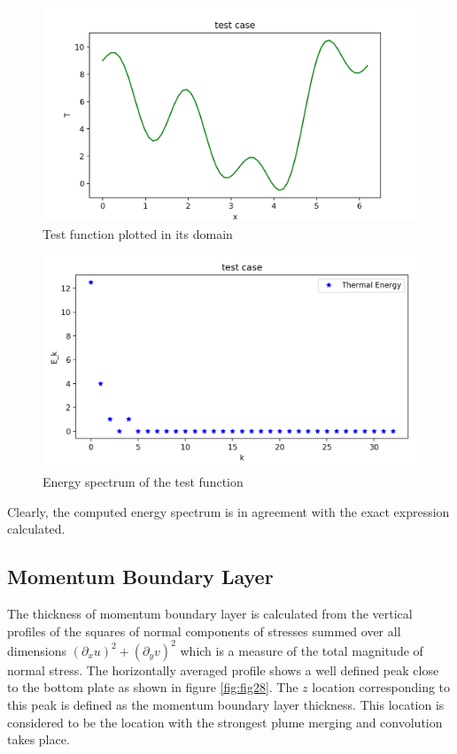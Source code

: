 \documentclass[12pt]{article}
\begin{document}
   \begin{figure}[!htb]
   	\includegraphics[width=\linewidth]{test1.png}
   	\caption{Test function plotted in its domain}
   	\label{fig:t1}
   \end{figure}
   
    \begin{figure}[!htb]
    	\includegraphics[width=\linewidth]{test2.png}
    	\caption{Energy spectrum of the test function}
    	\label{fig:t2}
    \end{figure}
    
    Clearly, the computed energy spectrum is in agreement with the exact expression calculated.
    
    
    \subsection{Momentum Boundary Layer}
    
    The thickness of momentum boundary layer is calculated from the vertical profiles of the squares of normal components of stresses summed over all dimensions $(\partial_x u)^2 + (\partial_y v)^2$ which is a measure of the total magnitude of normal stress. The horizontally averaged profile shows a well defined peak close to the bottom plate as shown in figure \ref{fig:fig28}. The $z$ location corresponding to this peak is defined as the momentum boundary layer thickness. This location is considered to be the location with the strongest plume merging and convolution takes place.
    
\end{document}
